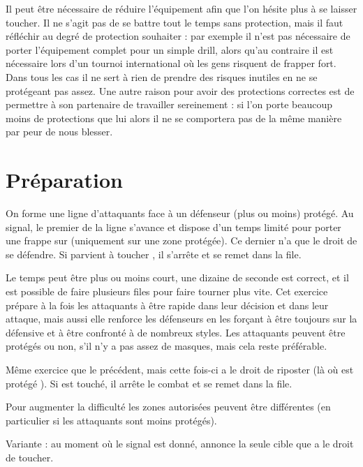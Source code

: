 Il peut être nécessaire de réduire l'équipement afin que l'on hésite plus à se laisser toucher.
Il ne s'agit pas de se battre tout le temps sans protection, mais il faut réfléchir au degré de protection souhaiter : par exemple il n'est pas nécessaire de porter l'équipement complet pour un simple drill, alors qu'au contraire il est nécessaire lors d'un tournoi international où les gens risquent de frapper fort.
Dans tous les cas il ne sert à rien de prendre des risques inutiles en ne se protégeant pas assez.
Une autre raison pour avoir des protections correctes est de permettre à son partenaire de travailler sereinement : si l'on porte beaucoup moins de protections que lui alors il ne se comportera pas de la même manière par peur de nous blesser.


\section{Préparation}


\begin{exercice}

On forme une ligne d'attaquants face à un défenseur \D (plus ou moins) protégé.
Au signal, le premier de la ligne \A s'avance et dispose d'un temps limité pour porter une frappe sur \D (uniquement sur une zone protégée).
Ce dernier n'a que le droit de se défendre.
Si \A parvient à toucher \D, il s'arrête et se remet dans la file.

Le temps peut être plus ou moins court, une dizaine de seconde est correct, et il est possible de faire plusieurs files pour faire tourner plus vite.
Cet exercice prépare à la fois les attaquants à être rapide dans leur décision et dans leur attaque, mais aussi elle renforce les défenseurs en les forçant à être toujours sur la défensive et à être confronté à de nombreux styles.
Les attaquants peuvent être protégés ou non, s'il n'y a pas assez de masques, mais cela reste préférable.
\end{exercice}


\begin{exercice}
Même exercice que le précédent, mais cette fois-ci \D a le droit de riposter (là où est protégé \D).
Si \A est touché, il arrête le combat et se remet dans la file.

Pour augmenter la difficulté les zones autorisées peuvent être différentes (en particulier si les attaquants sont moins protégés).

Variante : au moment où le signal est donné, \D annonce la seule cible que \A a le droit de toucher.
\end{exercice}


